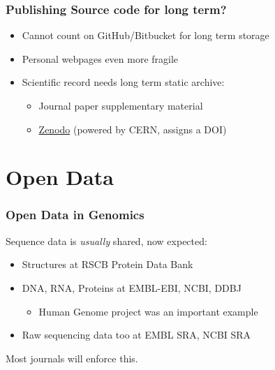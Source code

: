 \begin{frame}
  \frametitle{Publishing Source code for long term?}
  \begin{itemize}
    \item Cannot count on GitHub/Bitbucket for long term storage
    \item Personal webpages even more fragile
    \item Scientific record needs long term static archive:
      \begin{itemize}
        \item Journal paper supplementary material
        \item \href{http://about.zenodo.org/}{Zenodo} (powered by CERN, assigns a DOI)
      \end{itemize}
  \end{itemize}
\end{frame}

\section{Open Data}

\begin{frame}
  \frametitle{Open Data in Genomics}
  Sequence data is \emph{usually} shared, now expected:
  \begin{itemize}
    \item Structures at RSCB Protein Data Bank
    \item DNA, RNA, Proteins at EMBL-EBI, NCBI, DDBJ
      \begin{itemize}
        \item{Human Genome project was an important example}
      \end{itemize}
    \item Raw sequencing data too at EMBL SRA, NCBI SRA
  \end{itemize}
  Most journals will enforce this.
\end{frame}

